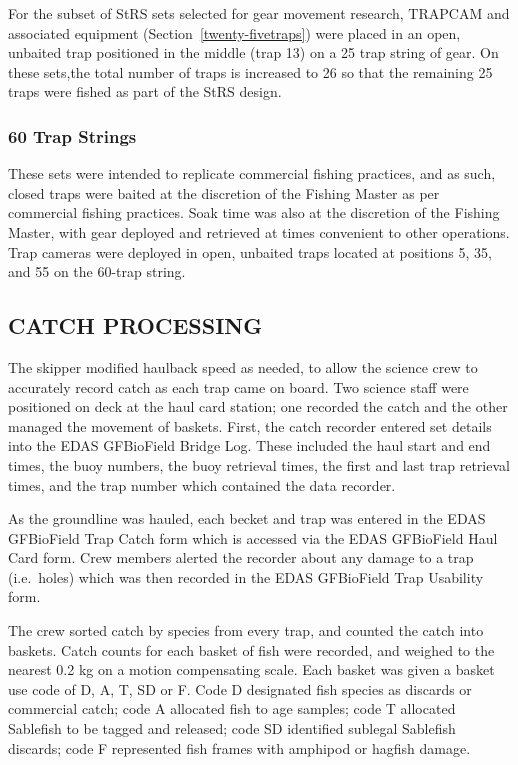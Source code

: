 \documentclass[12pt]{article}\usepackage[]{graphicx}\usepackage[]{color}
\begin{document}
For the subset of StRS sets selected for gear movement research, TRAPCAM and associated equipment (Section~\ref{twenty-fivetraps}) were placed in an open, unbaited trap positioned in the middle (trap 13) on a 25 trap string of gear. On these sets,the total number of traps is increased to 26 so that the remaining 25 traps were fished as part of the StRS design.

\hypertarget{trap-strings-1}{%
\subsubsection{60 Trap Strings}\label{trap-strings-1}}

These sets were intended to replicate commercial fishing practices, and as such, closed traps were baited at the discretion of the Fishing Master as per commercial fishing practices. Soak time was also at the discretion of the Fishing Master, with gear deployed and retrieved at times convenient to other operations. Trap cameras were deployed in open, unbaited traps located at positions 5, 35, and 55 on the 60-trap string.

\hypertarget{catch-processing}{%
\subsection{CATCH PROCESSING}\label{catch-processing}}

The skipper modified haulback speed as needed, to allow the science crew to accurately record catch as each trap came on board. Two science staff were positioned on deck at the haul card station; one recorded the catch and the other managed the movement of baskets. First, the catch recorder entered set details into the EDAS GFBioField Bridge Log. These included the haul start and end times, the buoy numbers, the buoy retrieval times, the first and last trap retrieval times, and the trap number which contained the data recorder.

As the groundline was hauled, each becket and trap was entered in the EDAS GFBioField Trap Catch form which is accessed via the EDAS GFBioField Haul Card form. Crew members alerted the recorder about any damage to a trap (i.e.~holes) which was then recorded in the EDAS GFBioField Trap Usability form.

The crew sorted catch by species from every trap, and counted the catch into baskets. Catch counts for each basket of fish were recorded, and weighed to the nearest 0.2 kg on a motion compensating scale. Each basket was given a basket use code of D, A, T, SD or F. Code D designated fish species as discards or commercial catch; code A allocated fish to age samples; code T allocated Sablefish to be tagged and released; code SD identified sublegal Sablefish discards; code F represented fish frames with amphipod or hagfish damage.
\end{document}
